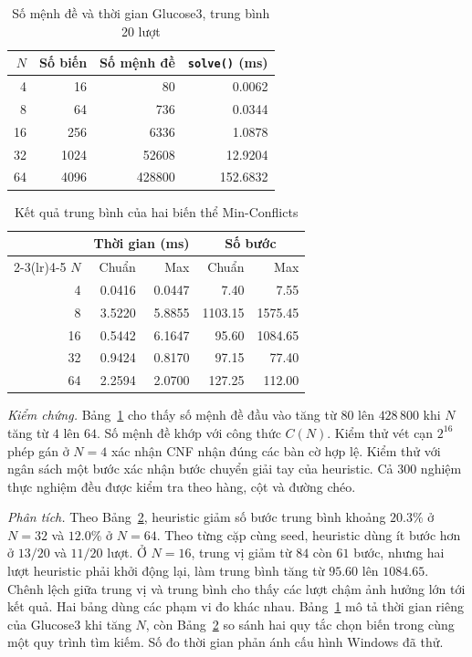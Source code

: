 \documentclass[conference]{IEEEtran}
\begin{document}
\begin{table}[H]
\centering
\caption{Số mệnh đề và thời gian Glucose3, trung bình 20 lượt}
\label{tab:sat}
\begin{tabular}{rrrr}
\toprule
$N$ & Số biến & Số mệnh đề & \texttt{solve()} (ms)\\
\midrule
4 & 16 & 80 & 0.0062\\
8 & 64 & 736 & 0.0344\\
16 & 256 & 6336 & 1.0878\\
32 & 1024 & 52608 & 12.9204\\
64 & 4096 & 428800 & 152.6832\\
\bottomrule
\end{tabular}
\end{table}

\begin{table}[H]
\centering
\caption{Kết quả trung bình của hai biến thể Min-Conflicts}
\label{tab:local}
\begin{tabular}{rrrrr}
\toprule
& \multicolumn{2}{c}{Thời gian (ms)} & \multicolumn{2}{c}{Số bước}\\
\cmidrule(lr){2-3}\cmidrule(lr){4-5}
$N$ & Chuẩn & Max & Chuẩn & Max\\
\midrule
4 & 0.0416 & 0.0447 & 7.40 & 7.55\\
8 & 3.5220 & 5.8855 & 1103.15 & 1575.45\\
16 & 0.5442 & 6.1647 & 95.60 & 1084.65\\
32 & 0.9424 & 0.8170 & 97.15 & 77.40\\
64 & 2.2594 & 2.0700 & 127.25 & 112.00\\
\bottomrule
\end{tabular}
\end{table}

\balance
\textit{Kiểm chứng.}
Bảng~\ref{tab:sat} cho thấy số mệnh đề đầu vào tăng từ $80$ lên
$428\,800$ khi $N$ tăng từ $4$ lên $64$. Số mệnh đề khớp với công
thức $C(N)$. Kiểm thử vét cạn $2^{16}$ phép gán ở $N=4$ xác nhận
CNF nhận đúng các bàn cờ hợp lệ. Kiểm thử với ngân sách một
bước xác nhận bước chuyển giải tay của heuristic. Cả $300$
nghiệm thực nghiệm đều được kiểm tra theo hàng, cột và đường chéo.

\textit{Phân tích.} Theo Bảng~\ref{tab:local}, heuristic giảm số bước trung bình
khoảng $20.3\%$ ở $N=32$ và $12.0\%$ ở $N=64$. Theo từng cặp
cùng seed, heuristic dùng ít bước hơn ở $13/20$ và $11/20$ lượt.
Ở $N=16$, trung vị giảm từ $84$ còn $61$ bước, nhưng hai lượt
heuristic phải khởi động lại, làm trung bình tăng từ $95.60$
lên $1084.65$. Chênh lệch giữa trung vị và trung bình cho thấy
các lượt chậm ảnh hưởng lớn tới kết quả. Hai bảng dùng các
phạm vi đo khác nhau. Bảng~\ref{tab:sat} mô tả thời gian riêng
của Glucose3 khi tăng $N$, còn Bảng~\ref{tab:local} so sánh hai
quy tắc chọn biến trong cùng một quy trình tìm kiếm. Số đo thời
gian phản ánh cấu hình Windows đã thử.
\end{document}
